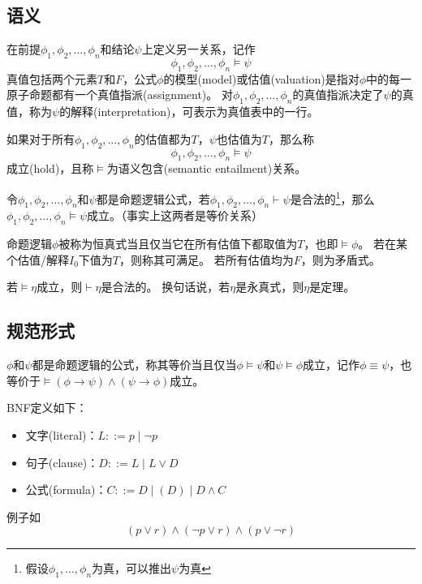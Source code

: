 \subsection{语义}
\begin{definition}[模型(model)]
在前提$\phi_1,\phi_2,\ldots,\phi_n$和结论$\psi$上定义另一关系，记作
\[\phi_1,\phi_2,\ldots,\phi_n\models\psi\]
真值包括两个元素$T$和$F$，公式$\phi$的模型(model)或估值(valuation)是指对$\phi$中的每一原子命题都有一个真值指派(assignment)。
对$\phi_1,\phi_2,\ldots,\phi_n$的真值指派决定了$\psi$的真值，称为$\psi$的解释(interpretation)，可表示为真值表中的一行。

如果对于所有$\phi_1,\phi_2,\ldots,\phi_n$的估值都为$T$，$\psi$也估值为$T$，那么称
\[\phi_1,\phi_2,\ldots,\phi_n\models\psi\]
成立(hold)，且称$\models$为语义包含(semantic entailment)关系。
\end{definition}
\begin{theorem}
令$\phi_1,\phi_2,\ldots,\phi_n$和$\psi$都是命题逻辑公式，若$\phi_1,\phi_2,\ldots,\phi_n\vdash\psi$是合法的\footnote{假设$\phi_1,\ldots,\phi_n$为真，可以推出$\psi$为真}，那么$\phi_1,\phi_2,\ldots,\phi_n\models\psi$成立。（事实上这两者是等价关系）
\end{theorem}

\begin{definition}
命题逻辑$\phi$被称为恒真式当且仅当它在所有估值下都取值为$T$，也即$\models\phi$。
若在某个估值/解释$I_0$下值为$T$，则称其可满足。
若所有估值均为$F$，则为矛盾式。
\end{definition}
\begin{theorem}
若$\models\eta$成立，则$\vdash\eta$是合法的。
换句话说，若$\eta$是永真式，则$\eta$是定理。
\end{theorem}

\subsection{规范形式}
\begin{definition}[语义等价]
$\phi$和$\psi$都是命题逻辑的公式，称其等价当且仅当$\phi\models\psi$和$\psi\models\phi$成立，记作$\phi\equiv\psi$，也等价于$\models(\phi\to\psi)\land(\psi\to\phi)$成立。
\end{definition}
\begin{definition}
BNF定义如下：
\begin{itemize}
	\item 文字(literal)：$L::=p\mid\lnot p$
	\item 句子(clause)：$D::=L\mid L\lor D$
	\item 公式(formula)：$C::=D\mid(D)\mid D\land C$
\end{itemize}
例子如
\[(p \lor r) \land (\lnot p \lor r) \land (p \lor \lnot r)\]
\end{definition}

